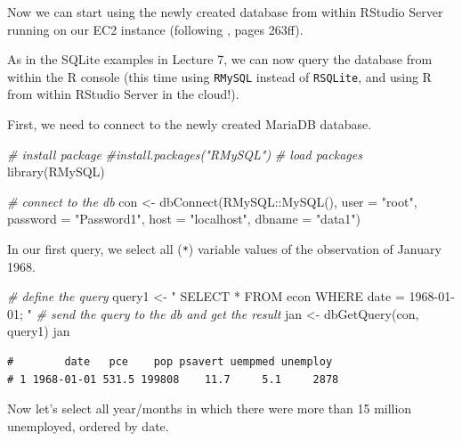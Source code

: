 \documentclass[
  12pt,
]{style/krantz}
\newenvironment{Shaded}{\begin{snugshade}}{\end{snugshade}}
\newcommand{\AttributeTok}[1]{\textcolor[rgb]{0.77,0.63,0.00}{#1}}
\newcommand{\CommentTok}[1]{\textcolor[rgb]{0.56,0.35,0.01}{\textit{#1}}}
\newcommand{\FunctionTok}[1]{\textcolor[rgb]{0.00,0.00,0.00}{#1}}
\newcommand{\NormalTok}[1]{#1}
\newcommand{\OtherTok}[1]{\textcolor[rgb]{0.56,0.35,0.01}{#1}}
\newcommand{\SpecialCharTok}[1]{\textcolor[rgb]{0.00,0.00,0.00}{#1}}
\newcommand{\StringTok}[1]{\textcolor[rgb]{0.31,0.60,0.02}{#1}}
\begin{document}
Now we can start using the newly created database from within RStudio Server running on our EC2 instance (following \citet{walkowiak_2016}, pages 263ff).

As in the SQLite examples in Lecture 7, we can now query the database from within the R console (this time using \texttt{RMySQL} instead of \texttt{RSQLite}, and using R from within RStudio Server in the cloud!).

First, we need to connect to the newly created MariaDB database.

\begin{Shaded}
\begin{Highlighting}[]
\CommentTok{\# install package}
\CommentTok{\#install.packages("RMySQL")}
\CommentTok{\# load packages}
\FunctionTok{library}\NormalTok{(RMySQL)}

\CommentTok{\# connect to the db}
\NormalTok{con }\OtherTok{\textless{}{-}} \FunctionTok{dbConnect}\NormalTok{(RMySQL}\SpecialCharTok{::}\FunctionTok{MySQL}\NormalTok{(), }
                 \AttributeTok{user =} \StringTok{"root"}\NormalTok{,}
                 \AttributeTok{password =} \StringTok{"Password1"}\NormalTok{,}
                 \AttributeTok{host =} \StringTok{"localhost"}\NormalTok{,}
                 \AttributeTok{dbname =} \StringTok{"data1"}\NormalTok{)}
\end{Highlighting}
\end{Shaded}

In our first query, we select all (\texttt{*}) variable values of the observation of January 1968.

\begin{Shaded}
\begin{Highlighting}[]
\CommentTok{\# define the query}
\NormalTok{query1 }\OtherTok{\textless{}{-}} 
\StringTok{"}
\StringTok{SELECT * FROM econ}
\StringTok{WHERE date = \textquotesingle{}1968{-}01{-}01\textquotesingle{};}
\StringTok{"}
\CommentTok{\# send the query to the db and get the result}
\NormalTok{jan }\OtherTok{\textless{}{-}} \FunctionTok{dbGetQuery}\NormalTok{(con, query1)}
\NormalTok{jan}
\end{Highlighting}
\end{Shaded}

\begin{verbatim}
#        date   pce    pop psavert uempmed unemploy
# 1 1968-01-01 531.5 199808    11.7     5.1     2878
\end{verbatim}

Now let's select all year/months in which there were more than 15 million unemployed, ordered by date.
\end{document}
